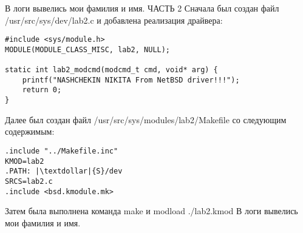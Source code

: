 \documentclass[a4paper, 14pt]{extarticle}
\begin{document}
\begin{flushleft}
В логи вывелись мои фамилия и имя. \newline
ЧАСТЬ 2 \newline
Сначала был создан файл /usr/src/sys/dev/lab2.c и добавлена реализация драйвера:
\end{flushleft}

\begin{verbatim}
#include <sys/module.h>
MODULE(MODULE_CLASS_MISC, lab2, NULL);

static int lab2_modcmd(modcmd_t cmd, void* arg) {
	printf("NASHCHEKIN NIKITA From NetBSD driver!!!");
	return 0;
}
\end{verbatim}

\begin{flushleft}
Далее был создан файл /usr/src/sys/modules/lab2/Makefile со следующим содержимым:
\end{flushleft}

\begin{verbatim}
.include "../Makefile.inc"
KMOD=lab2
.PATH: |\textdollar|{S}/dev
SRCS=lab2.c
.include <bsd.kmodule.mk>
\end{verbatim}

\begin{flushleft}
Затем была выполнена команда make и modload ./lab2.kmod \newline
В логи вывелись мои фамилия и имя.
\end{flushleft}
\pagebreak
\end{document}

